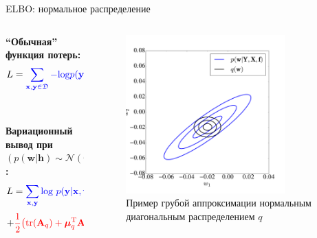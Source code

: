 \documentclass[usenames,dvipsnames,10pt,pdf,utf8,russian,aspectratio=43]{beamer}
\begin{document}
\begin{frame}{ELBO: нормальное распределение}
\begin{columns}[T] 
\begin{column}{.48\textwidth}
\textbf{``Обычная'' функция потерь:}\\
$$
L = \textcolor{blue}{\sum_{\mathbf{x}, \mathbf{y} \in \mathfrak{D}} - \text{log}p(\mathbf{y}|\mathbf{x}, \mathbf{w})} + \textcolor{red}{\lambda||\mathbf{w}||_2^2}.
$$\\~\\

\textbf{Вариационный вывод при $(p(\mathbf{w}|\mathbf{h}) \sim \mathcal{N}(\mathbf{0}, \mathbf{1}))$:}\\
$$
L =   \textcolor{blue}{\sum_{\mathbf{x}, \mathbf{y}} \text{log}~p(\mathbf{y}|\mathbf{x}, \hat{\mathbf{w}})} +
$$
$$ + \textcolor{red}{\frac{1}{2} \bigl( \text{tr} (\mathbf{A}_q) + \boldsymbol{\mu}_q^\text{T}\mathbf{A}^{-1}\boldsymbol{\mu}_q  - \text{ln}~|\mathbf{A}_q| \bigr)}.
$$\\~\\

\end{column}%
\hfill%
\begin{column}{.48\textwidth}

\begin{center}
\begin{figure}
\caption*{Пример грубой аппроксимации нормальным диагональным распределением $q$}
\includegraphics[width=0.8\textwidth]{mf.pdf}
\end{figure}
\end{center}

\end{column}%
\end{columns}

\end{frame}
\end{document}
